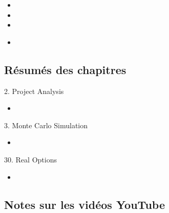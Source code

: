 \documentclass[12pt, titlepage, french]{report}
\begin{document}
\begin{ASM_chapter}
\begin{itemize}
	\item	{}
	\item	{}
	\item	{}
\end{itemize}
\end{ASM_chapter}

\begin{YTB_vids}
\begin{itemize}
	\item	
\end{itemize}
\end{YTB_vids}

\subsection{Résumés des chapitres}

\begin{CHPT_SUMM_AUTO}[label = {L.-2}]{2. Project Analysis}
	\begin{itemize}
		\item	
	\end{itemize}
\end{CHPT_SUMM_AUTO}

\begin{CHPT_SUMM_AUTO}[label = {L.-3}]{3. Monte Carlo Simulation}
	\begin{itemize}
		\item	
	\end{itemize}
\end{CHPT_SUMM_AUTO}

\begin{CHPT_SUMM_AUTO}[label = {L.-30}]{30. Real Options}
	\begin{itemize}
		\item	
	\end{itemize}
\end{CHPT_SUMM_AUTO}

\subsection{Notes sur les vidéos YouTube}

\end{document}
